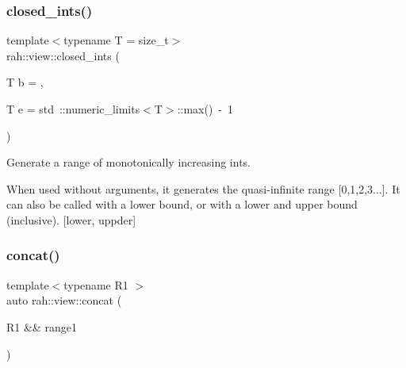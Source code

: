 \subsubsection{\texorpdfstring{closed\_ints()}{closed\_ints()}}
{\footnotesize\ttfamily template$<$typename T  = size\+\_\+t$>$ \\
rah\+::view\+::closed\+\_\+ints (\begin{DoxyParamCaption}\item[{T}]{b = {},  }\item[{T}]{e = {\ttfamily std~\+:\+:numeric\+\_\+limits$<$T$>$\+:\+:max()~-\/~1} }\end{DoxyParamCaption})}



Generate a range of monotonically increasing ints. 

When used without arguments, it generates the quasi-\/infinite range \mbox{[}0,1,2,3...\mbox{]}. It can also be called with a lower bound, or with a lower and upper bound (inclusive). \mbox{[}lower, uppder\mbox{]}


\begin{DoxyCodeInclude}{0}
\end{DoxyCodeInclude}
\mbox{\label{namespacerah_1_1view_ad7cd13dd36976288286478b47c3f5747}} 
\subsubsection{\texorpdfstring{concat()}{concat()}\hspace{0.1cm}{\footnotesize\ttfamily [1/3]}}
{\footnotesize\ttfamily template$<$typename R1 $>$ \\
auto rah\+::view\+::concat (\begin{DoxyParamCaption}\item[{R1 \&\&}]{range1 }\end{DoxyParamCaption})}



